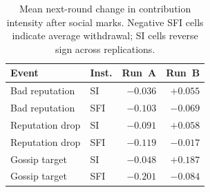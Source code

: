 \begin{table}[t]
\centering
\caption{Mean next-round change in contribution intensity after social marks.
Negative SFI cells indicate average withdrawal; SI cells reverse sign across replications.}
\label{tab:event_study}
\scriptsize
\setlength{\tabcolsep}{2.8pt}
\begin{tabular}{llrr}
\toprule
Event & Inst. & Run~A & Run~B \\
\midrule
Bad reputation & SI & $-0.036$ & $+0.055$ \\
Bad reputation & SFI & $-0.103$ & $-0.069$ \\
Reputation drop & SI & $-0.091$ & $+0.058$ \\
Reputation drop & SFI & $-0.119$ & $-0.017$ \\
Gossip target & SI & $-0.048$ & $+0.187$ \\
Gossip target & SFI & $-0.201$ & $-0.084$ \\
\bottomrule
\end{tabular}
\end{table}
